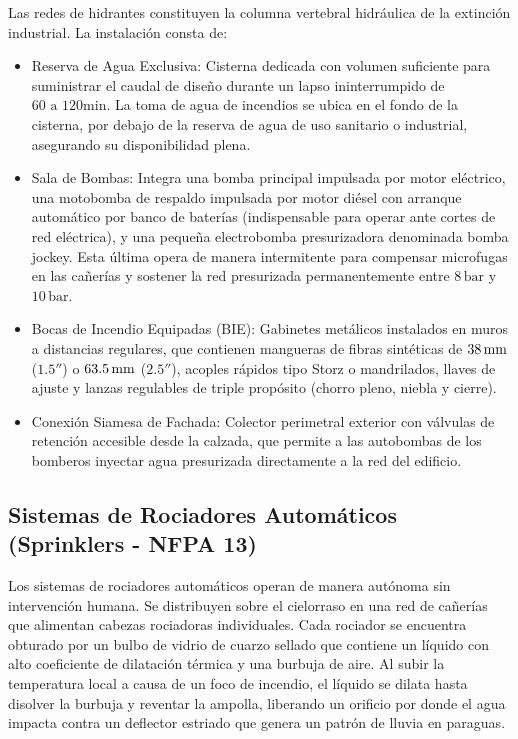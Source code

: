 Las redes de hidrantes constituyen la columna vertebral hidráulica de la extinción industrial. La instalación consta de:
\begin{itemize}
    \item Reserva de Agua Exclusiva: Cisterna dedicada con volumen suficiente para suministrar el caudal de diseño durante
          un lapso ininterrumpido de $60\text{ a }120\unit{\minute}$. La toma de agua de incendios se ubica en el fondo de
          la cisterna, por debajo de la reserva de agua de uso sanitario o industrial, asegurando su disponibilidad plena.
    \item Sala de Bombas: Integra una bomba principal impulsada por motor eléctrico, una motobomba de respaldo impulsada
          por motor diésel con arranque automático por banco de baterías (indispensable para operar ante cortes de red
          eléctrica), y una pequeña electrobomba presurizadora denominada bomba jockey. Esta última opera de manera
          intermitente para compensar microfugas en las cañerías y sostener la red presurizada permanentemente entre
          $8\,\mathrm{bar}$ y $10\,\mathrm{bar}$.
    \item Bocas de Incendio Equipadas (BIE): Gabinetes metálicos instalados en muros a distancias regulares, que contienen
          mangueras de fibras sintéticas de $38\,\mathrm{mm}$ ($1.5''$) o $63.5\,\mathrm{mm}$ ($2.5''$), acoples rápidos tipo Storz o
          mandrilados, llaves de ajuste y lanzas regulables de triple propósito (chorro pleno, niebla y cierre).
    \item Conexión Siamesa de Fachada: Colector perimetral exterior con válvulas de retención accesible desde la calzada,
          que permite a las autobombas de los bomberos inyectar agua presurizada directamente a la red del edificio.
\end{itemize}

\subsection{Sistemas de Rociadores Automáticos (Sprinklers - NFPA 13)}

Los sistemas de rociadores automáticos operan de manera autónoma sin intervención humana. Se distribuyen sobre el cielorraso
en una red de cañerías que alimentan cabezas rociadoras individuales. Cada rociador se encuentra obturado por un bulbo de
vidrio de cuarzo sellado que contiene un líquido con alto coeficiente de dilatación térmica y una burbuja de aire. Al subir
la temperatura local a causa de un foco de incendio, el líquido se dilata hasta disolver la burbuja y reventar la ampolla,
liberando un orificio por donde el agua impacta contra un deflector estriado que genera un patrón de lluvia en paraguas.

